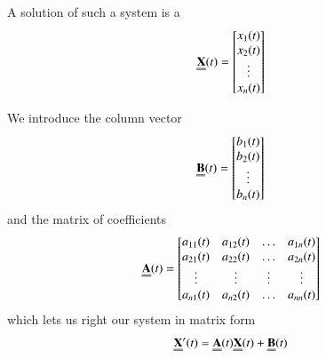 \documentclass[12pt, a4paper, oneside, openright, titlepage]{book}
\begin{document}

\begin{defn}[Solution]
        A solution of such a system is a  \begin{equation}
                \Emph{X}(t) = \begin{bmatrix}x_1(t) \\ x_2(t) \\ \vdots \\ x_n(t) \end{bmatrix}
        \end{equation}
\end{defn}




\begin{rmk}[Notation]
        We introduce the column vector \begin{equation}
                \Emph{B}(t) = \begin{bmatrix}b_1(t) \\ b_2(t) \\ \vdots \\ b_n(t) \end{bmatrix}
        \end{equation}
        and the matrix of coefficients \begin{equation}
                \Emph{A}(t) = \begin{bmatrix}a_{11}(t) & a_{12}(t) & \hdots & a_{1n}(t) \\ a_{21}(t) & a_{22}(t) & \hdots & a_{2n}(t)\\ \vdots & \vdots & \vdots & \vdots \\ a_{n1}(t) & a_{n2}(t) & \hdots & a_{nn}(t) \end{bmatrix}
        \end{equation}
        which lets us right our system in matrix form \begin{equation}
                \Emph{X}'(t) = \Emph{A}(t)\Emph{X}(t)+\Emph{B}(t)
        \end{equation}
\end{rmk}


\end{document}
